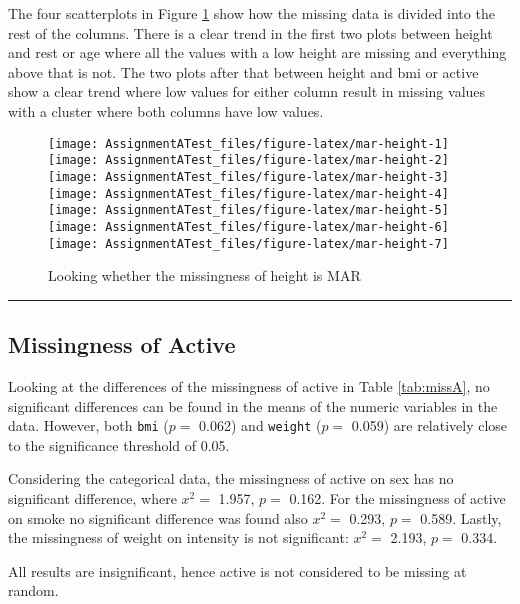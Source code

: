 \documentclass[
]{article}
\begin{document}
The four scatterplots in Figure \ref{fig:mar-height} show how the missing data is divided into the rest of the columns. There is a clear trend in the first two plots between height and rest or age where all the values with a low height are missing and everything above that is not. The two plots after that between height and bmi or active show a clear trend where low values for either column result in missing values with a cluster where both columns have low values.

\begin{figure}
\texttt{[image: AssignmentATest\_files/figure-latex/mar-height-1]} \texttt{[image: AssignmentATest\_files/figure-latex/mar-height-2]} \texttt{[image: AssignmentATest\_files/figure-latex/mar-height-3]} \texttt{[image: AssignmentATest\_files/figure-latex/mar-height-4]} \texttt{[image: AssignmentATest\_files/figure-latex/mar-height-5]} \texttt{[image: AssignmentATest\_files/figure-latex/mar-height-6]} \texttt{[image: AssignmentATest\_files/figure-latex/mar-height-7]} \caption{Looking whether the missingness of height is MAR}\label{fig:mar-height}
\end{figure}

\begin{center}\rule{0.5\linewidth}{0.5pt}\end{center}

\hypertarget{missingness-of-active}{%
\subsection{Missingness of Active}\label{missingness-of-active}}

Looking at the differences of the missingness of active in Table \ref{tab:missA}, no significant differences can be found in the means of the numeric variables in the data. However, both \texttt{bmi} (\(p =\) 0.062) and \texttt{weight} (\(p =\) 0.059) are relatively close to the significance threshold of 0.05.

Considering the categorical data, the missingness of active on sex has no significant difference, where \(x^2 =\) 1.957, \(p =\) 0.162. For the missingness of active on smoke no significant difference was found also \(x^2 =\) 0.293, \(p =\) 0.589. Lastly, the missingness of weight on intensity is not significant: \(x^2 =\) 2.193, \(p =\) 0.334.

All results are insignificant, hence active is not considered to be missing at random.
\end{document}
